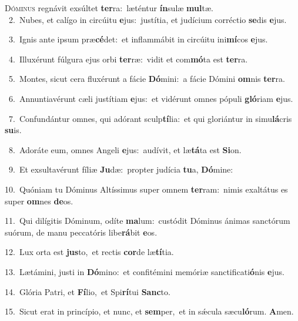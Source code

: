 \lettrine{\initial\textcolor{\initialcolor}{D}}{óminus} regnávit exsúltet \textbf{ter}\-ra:~\star læténtur \textbf{ín}\-sulæ \textbf{mul}\-tæ.\\
{\numbfont\textcolor{\numbcolor}{~2.}}~Nubes, et calígo in circúitu \textbf{e}\-jus:~\star justítia, et judícium corréctio \textbf{se}\-dis \textbf{e}\-jus.\par
{\numbfont\textcolor{\numbcolor}{~3.}}~Ignis ante ipsum præ\-\textbf{cé}\-det:~\star et inflammábit in circúitu ini\-\textbf{mí}\-cos \textbf{e}\-jus.\par
{\numbfont\textcolor{\numbcolor}{~4.}}~Illuxérunt fúlgura ejus orbi \textbf{ter}\-ræ:~\star vidit et com\-\textbf{mó}\-ta est \textbf{ter}\-ra.\par
{\numbfont\textcolor{\numbcolor}{~5.}}~Montes, sicut cera fluxérunt a fácie \textbf{Dó}\-mini:~\star a fácie Dómini \textbf{om}\-nis \textbf{ter}\-ra.\par
{\numbfont\textcolor{\numbcolor}{~6.}}~Annuntiavérunt cæli justítiam \textbf{e}\-jus:~\star et vidérunt omnes pópuli \textbf{gló}\-riam \textbf{e}\-jus.\par
{\numbfont\textcolor{\numbcolor}{~7.}}~Confundántur omnes, qui adórant sculp\-\textbf{tí}\-lia:~\star et qui gloriántur in simu\-\textbf{lá}\-cris \textbf{su}\-is.\par
{\numbfont\textcolor{\numbcolor}{~8.}}~Adoráte eum, omnes Angeli \textbf{e}\-jus:~\star audívit, et læ\-\textbf{tá}\-ta est \textbf{Si}\-on.\par
{\numbfont\textcolor{\numbcolor}{~9.}}~Et exsultavérunt fíliæ \textbf{Ju}\-dæ:~\star propter judícia \textbf{tu}\-a, \textbf{Dó}\-mine:\par
{\numbfont\textcolor{\numbcolor}{10.}}~Quóniam tu Dóminus Altíssimus super omnem \textbf{ter}\-ram:~\star nimis exaltátus es super \textbf{om}\-nes \textbf{de}\-os.\par
{\numbfont\textcolor{\numbcolor}{11.}}~Qui dilígitis Dóminum, odíte \textbf{ma}\-lum:~\star custódit Dóminus ánimas sanctórum suórum, de manu peccatóris libe\-\textbf{rá}\-bit \textbf{e}\-os.\par
{\numbfont\textcolor{\numbcolor}{12.}}~Lux orta est \textbf{jus}\-to,~\star et rectis \textbf{cor}\-de læ\-\textbf{tí}\-tia.\par
{\numbfont\textcolor{\numbcolor}{13.}}~Lætámini, justi in \textbf{Dó}\-mino:~\star et confitémini memóriæ sanctificati\-\textbf{ó}\-nis \textbf{e}\-jus.\par
{\numbfont\textcolor{\numbcolor}{14.}}~Glória Patri, et \textbf{Fí}\-lio,~\star et Spi\-\textbf{rí}\-tui \textbf{Sanc}\-to.\par
{\numbfont\textcolor{\numbcolor}{15.}}~Sicut erat in princípio, et nunc, et \textbf{sem}\-per,~\star et in sǽcula sæcu\-\textbf{ló}\-rum. \textbf{A}\-men.\par
